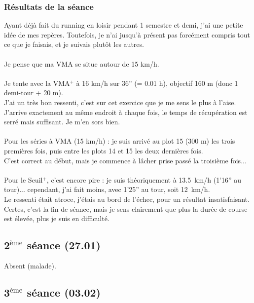 \documentclass{article}
\begin{document}
        \subsubsection*{Résultats de la séance}
            Ayant déjà fait du running en loisir pendant 1 semestre et demi, j'ai une petite idée de mes repères. Toutefois, je n'ai jusqu'à présent pas forcément compris tout ce que je faisais, et je suivais plutôt les autres.\\\\
            Je pense que ma VMA se situe autour de 15 km/h.\\\\
            Je tente avec la VMA$^+$ à 16 km/h sur 36'' (= 0.01 h), objectif 160 m (donc 1 demi-tour + 20 m).\\
            J'ai un très bon ressenti, c'est sur cet exercice que je me sens le plus à l'aise.\\
            J'arrive exactement au même endroit à chaque fois, le temps de récupération est serré mais suffisant. Je m'en sors bien.\\\\
            Pour les séries à VMA (15 km/h) : je suis arrivé au plot 15 (300 m) les trois premières fois, puis entre les plots 14 et 15 les deux dernières fois.\\
            C'est correct au début, mais je commence à lâcher prise passé la troisième fois...\\\\
            Pour le Seuil$^+$, c'est encore pire : je suis théoriquement à 13.5 km/h (1'16'' au tour)... cependant, j'ai fait moins, avec 1'25'' au tour, soit 12 km/h.\\
            Le ressenti était atroce, j'étais au bord de l'échec, pour un résultat insatisfaisant. Certes, c'est la fin de séance, mais je sens clairement que plus la durée de course est élevée, plus je suis en difficulté.
    \subsection{2$^{\text{ème}}$ séance (27.01)}
        Absent (malade).
    
    \subsection{3$^{\text{ème}}$ séance (03.02)}
\end{document}
